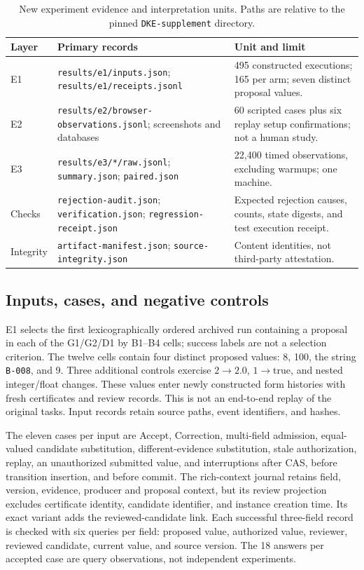 \documentclass[preprint,12pt,authoryear]{elsarticle}
\newcommand{\code}[1]{\nolinkurl{#1}}
\begin{document}
\begin{table}[htbp]
\centering\small
\caption{New experiment evidence and interpretation units. Paths are relative to the pinned \code{DKE-supplement} directory.}
\begin{tabularx}{\textwidth}{@{}l>{\raggedright\arraybackslash}p{}X@{}}
\toprule
Layer & Primary records & Unit and limit \\
\midrule
E1 & \code{results/e1/inputs.json}; \code{results/e1/receipts.jsonl} & 495 constructed executions; 165 per arm; seven distinct proposal values. \\
E2 & \code{results/e2/browser-observations.jsonl}; screenshots and databases & 60 scripted cases plus six replay setup confirmations; not a human study. \\
E3 & \code{results/e3/*/raw.jsonl}; \code{summary.json}; \code{paired.json} & 22,400 timed observations, excluding warmups; one machine. \\
Checks & \code{rejection-audit.json}; \code{verification.json}; \code{regression-receipt.json} & Expected rejection causes, counts, state digests, and test execution receipt. \\
Integrity & \code{artifact-manifest.json}; \code{source-integrity.json} & Content identities, not third-party attestation. \\
\bottomrule
\end{tabularx}
\end{table}

\subsection{Inputs, cases, and negative controls}

E1 selects the first lexicographically ordered archived run containing a proposal in each of the G1/G2/D1 by B1--B4 cells; success labels are not a selection criterion. The twelve cells contain four distinct proposed values: 8, 100, the string \code{B-008}, and 9. Three additional controls exercise $2\rightarrow2.0$, $1\rightarrow\mathrm{true}$, and nested integer/float changes. These values enter newly constructed form histories with fresh certificates and review records. This is not an end-to-end replay of the original tasks. Input records retain source paths, event identifiers, and hashes.

The eleven cases per input are Accept, Correction, multi-field admission, equal-valued candidate substitution, different-evidence substitution, stale authorization, replay, an unauthorized submitted value, and interruptions after CAS, before transition insertion, and before commit. The rich-context journal retains field, version, evidence, producer and proposal context, but its review projection excludes certificate identity, candidate identifier, and instance creation time. Its exact variant adds the reviewed-candidate link. Each successful three-field record is checked with six queries per field: proposed value, authorized value, reviewer, reviewed candidate, current value, and source version. The 18 answers per accepted case are query observations, not independent experiments.
\end{document}
